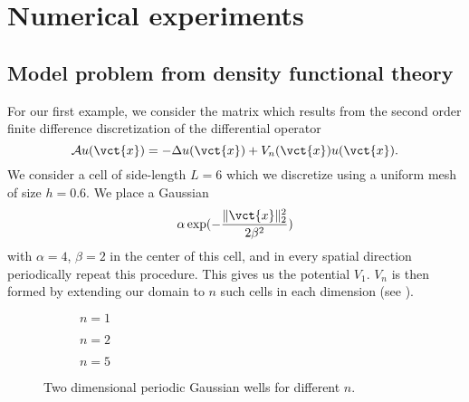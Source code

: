 \chapter{Numerical experiments}
\label{chp:5-experiments}



\section{Model problem from density functional theory}
\label{sec:5-experiments-density-function}

For our first example, we consider the matrix which results from the second order
finite difference discretization of the differential operator
\begin{equation}
    \mathcal{A} u(\vct{x}) = - \Delta u(\vct{x}) + V_n(\vct{x}) u(\vct{x}).
    \label{equ:5-experiments-electronic-hamiltonian}
\end{equation}
We consider a cell of side-length $L=6$ which we discretize using a uniform
mesh of size $h=0.6$. We place a Gaussian
\begin{equation}
    \alpha \exp(-\frac{\lVert \vct{x} \rVert _2^2}{ 2 \beta^2 })
    \label{equ:5-experiments-gaussian-cell}
\end{equation}
with $\alpha = 4$, $\beta = 2$ in the center of this cell, and in every
spatial direction periodically repeat this procedure. This gives us the potential
$V_1$. $V_n$ is then formed by extending our domain to $n$ such cells in each
dimension (see ). 
\begin{figure}[ht]
    \begin{subfigure}[b]{0.33\columnwidth}
        
        \caption{$n=1$}
        \label{fig:5-experiments-periodic-gaussian-well-1}
    \end{subfigure}
    \begin{subfigure}[b]{0.33\columnwidth}
        
        \caption{$n=2$}
        \label{fig:5-experiments-periodic-gaussian-well-2}
    \end{subfigure}
    \begin{subfigure}[b]{0.33\columnwidth}
        
        \caption{$n=5$}
        \label{fig:5-experiments-periodic-gaussian-well-5}
    \end{subfigure}
    \caption{Two dimensional periodic Gaussian wells for different $n$.}
    \label{fig:5-experiments-periodic-gaussian-well}
\end{figure}

